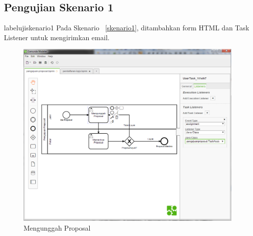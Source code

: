 \subsection{Pengujian Skenario 1}
label{ujiskenario1}
Pada Skenario ~\ref{skenario1}, ditambahkan form HTML dan Task Listener untuk mengirimkan email.
		\begin{figure}[H]
			\centering
			\includegraphics[scale=0.5]{Gambar/Bab-5/bpmn1}
			\caption{Mengunggah Proposal} 
			\label{fig:mengunggah proposal}
		\end{figure}
		
